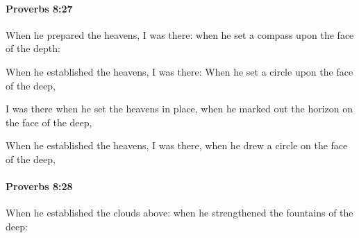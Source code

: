 		\paragraph{Proverbs 8:27} %
			\label{PROVERBS-8-27}

			When he prepared the heavens, I was there: when he set a compass upon the face of the depth:

			\begin{versebox}
					\item[BHS] 
					\item[ASV] When he established the heavens, I was there: When he set a circle upon the face of the deep,
					\item[NIV] I was there when he set the heavens in place, when he marked out the horizon on the face of the deep,
					\item[NRSV] When he established the heavens, I was there, when he drew a circle on the face of the deep,
			\end{versebox}

		\paragraph{Proverbs 8:28} %
			\label{PROVERBS-8-28}

			When he established the clouds above: when he strengthened the fountains of the deep:

